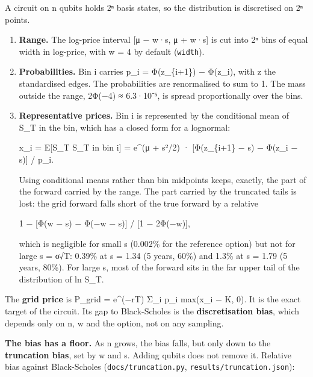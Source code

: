 \documentclass[
  10pt,
]{article}
\begin{document}
A circuit on n qubits holds 2ⁿ basis states, so the distribution is
discretised on 2ⁿ points.

\begin{enumerate}
\def\labelenumi{\arabic{enumi}.}
\item
  \textbf{Range.} The log-price interval {[}μ − w·s, μ + w·s{]} is cut
  into 2ⁿ bins of equal width in log-price, with w = 4 by default
  (\texttt{width}).
\item
  \textbf{Probabilities.} Bin i carries p\_i = Φ(z\_\{i+1\}) − Φ(z\_i),
  with z the standardised edges. The probabilities are renormalised to
  sum to 1. The mass outside the range, 2Φ(−4) ≈ 6.3·10⁻⁵, is spread
  proportionally over the bins.
\item
  \textbf{Representative prices.} Bin i is represented by the
  conditional mean of S\_T in the bin, which has a closed form for a
  lognormal:

  x\_i = E{[}S\_T \textbar{} S\_T in bin i{]} = e\^{}(μ + s²/2) ·
  {[}Φ(z\_\{i+1\} − s) − Φ(z\_i − s){]} / p\_i.

  Using conditional means rather than bin midpoints keeps, exactly, the
  part of the forward carried by the range. The part carried by the
  truncated tails is lost: the grid forward falls short of the true
  forward by a relative

  1 − {[}Φ(w − s) − Φ(−w − s){]} / {[}1 − 2Φ(−w){]},

  which is negligible for small s (0.002\% for the reference option) but
  not for large s = σ√T: 0.39\% at s = 1.34 (5 years, 60\%) and 1.3\% at
  s = 1.79 (5 years, 80\%). For large s, most of the forward sits in the
  far upper tail of the distribution of ln S\_T.
\end{enumerate}

The \textbf{grid price} is P\_grid = e\^{}(−rT) Σ\_i p\_i max(x\_i − K,
0). It is the exact target of the circuit. Its gap to Black-Scholes is
the \textbf{discretisation bias}, which depends only on n, w and the
option, not on any sampling.

\textbf{The bias has a floor.} As n grows, the bias falls, but only down
to the \textbf{truncation bias}, set by w and s. Adding qubits does not
remove it. Relative bias against Black-Scholes
(\texttt{docs/truncation.py}, \texttt{results/truncation.json}):
\end{document}
